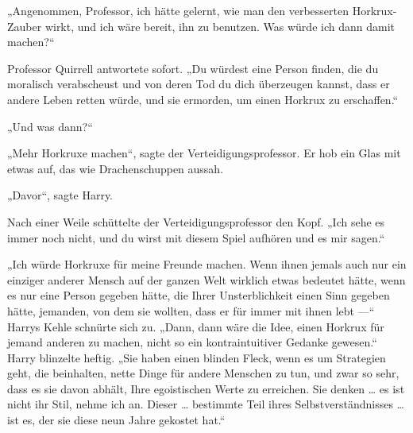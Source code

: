 „Angenommen, Professor, ich hätte gelernt, wie man den verbesserten Horkrux-Zauber wirkt, und ich wäre bereit, ihn zu benutzen. Was würde ich dann damit machen?“

Professor Quirrell antwortete sofort.
„Du würdest eine Person finden, die du moralisch verabscheust und von deren Tod du dich überzeugen kannst, dass er andere Leben retten würde, und sie ermorden, um einen Horkrux zu erschaffen.“

„Und was dann?“

„Mehr Horkruxe machen“, sagte der Verteidigungsprofessor.
Er hob ein Glas mit etwas auf, das wie Drachenschuppen aussah.

„Davor“, sagte Harry.

Nach einer Weile schüttelte der Verteidigungsprofessor den Kopf.
„Ich sehe es immer noch nicht, und du wirst mit diesem Spiel aufhören und es mir sagen.“

„Ich würde Horkruxe für meine Freunde machen. Wenn ihnen jemals auch nur ein einziger anderer Mensch auf der ganzen Welt wirklich etwas bedeutet hätte, wenn es nur eine Person gegeben hätte, die Ihrer Unsterblichkeit einen Sinn gegeben hätte, jemanden, von dem sie wollten, dass er für immer mit ihnen lebt —“
Harrys Kehle schnürte sich zu.
„Dann, dann wäre die Idee, einen Horkrux für jemand anderen zu machen, nicht so ein kontraintuitiver Gedanke gewesen.“
Harry blinzelte heftig.
„Sie haben einen blinden Fleck, wenn es um Strategien geht, die beinhalten, nette Dinge für andere Menschen zu tun, und zwar so sehr, dass es sie davon abhält, Ihre egoistischen Werte zu erreichen. Sie denken … es ist nicht ihr Stil, nehme ich an. Dieser … bestimmte Teil ihres Selbstverständnisses … ist es, der sie diese neun Jahre gekostet hat.“


